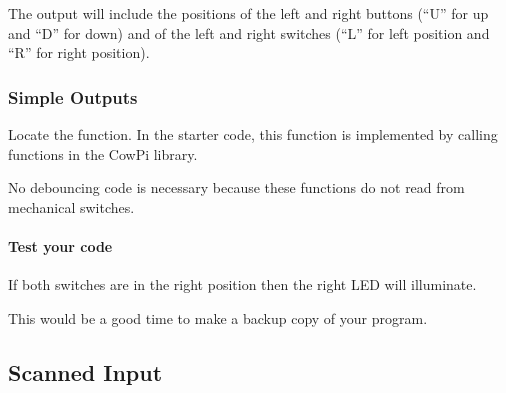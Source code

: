 \begin{description}
\end{description}
The output will include the positions of the left and right buttons (``U'' for up and ``D'' for down) and of the left and right switches (``L'' for left position and ``R'' for right position).


\subsubsection{Simple Outputs}

Locate the  function.
In the starter code, this function is implemented by calling functions in the CowPi library.

\begin{description}
    \begin{description}
        \item[\phantom{xxx}$\bullet$] No debouncing code is necessary because these functions do not read from mechanical switches.
    \end{description}
\end{description}

\paragraph{Test your code}

\begin{description}
\end{description}
If both switches are in the right position then the right LED will illuminate.

\vspace{1cm}

This would be a good time to make a backup copy of your program.


\subsection{Scanned Input} \label{subsec:ScannedInput}

